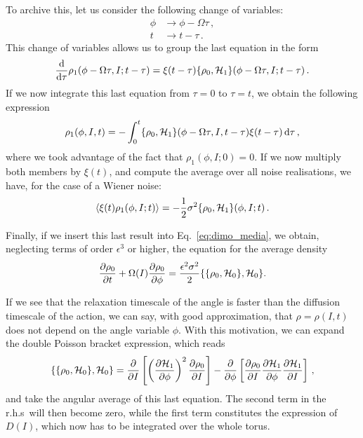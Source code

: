 To archive this, let us consider the following change of variables:
\begin{equation}
	\begin{aligned}
		\phi &\to \phi - \Omega \tau\,, \\
		t &\to t - \tau\,.
	\end{aligned}		
\end{equation}
This change of variables allows us to group the last equation in the form
\begin{equation}
	\dv{}{\tau}\/\rho_1(\phi - \Omega \tau, I; t - \tau) = \xi(t- \tau)\{\rho_0, \mathcal{H}_1\}(\phi - \Omega \tau, I; t - \tau)\,.
\end{equation}
If we now integrate this last equation from \(\tau = 0\) to \(\tau = t\), we obtain the following expression
\begin{equation}
	\rho_1(\phi, I, t) = -\int_0^t\{\rho_0, \mathcal{H}_1\}(\phi - \Omega \tau, I, t - \tau)\xi(t-\tau)\,\mathrm{d}\tau\,,
\end{equation}
where we took advantage of the fact that \(\rho_1(\phi, I; 0)=0\). If we now multiply both members by \(\xi(t)\), and compute the average over all noise realisations, we have, for the case of a Wiener noise:
\begin{equation}
	\langle \xi(t)\rho_1(\phi, I; t) \rangle = -\frac{1}{2}\sigma^2 \{\rho_0, \mathcal{H}_1\}(\phi, I; t)\,.
\end{equation}

Finally, if we insert this last result into Eq.~\eqref{eq:dimo_media}, we obtain, neglecting terms of order \(\epsilon^3\) or higher, the equation for the average density
\begin{equation}
 	\pdv{\rho_0}{t}\/ + \Omega (I) \pdv{\rho_0}{\phi}\/ = \frac{\epsilon^2 \sigma^2}{2}\{\{\rho_0, \mathcal{H}_0\}, \mathcal{H}_0\}.
\end{equation}

If we see that the relaxation timescale of the angle is faster than the diffusion timescale of the action, we can say, with good approximation, that \(\rho=\rho(I,t)\) does not depend on the angle variable \(\phi\). With this motivation, we can expand the double Poisson bracket expression, which reads
\begin{equation}
	\{\{\rho_0, \mathcal{H}_0\}, \mathcal{H}_0\} = \pdv{}{I}\/\left[\left(\pdv{\mathcal{H}_1}{\phi}\/\right)^2 \pdv{\rho_0}{I}\/\right] - \pdv{}{\phi}\/\left[\pdv{\rho_0}{I}\/\pdv{\mathcal{H}_1}{\phi}\/\pdv{\mathcal{H}_1}{I}\/\right]\,,
\end{equation}
and take the angular average of this last equation. The second term in the r.h.s\ will then become zero, while the first term constitutes the expression of \(D(I)\), which now has to be integrated over the whole torus.

